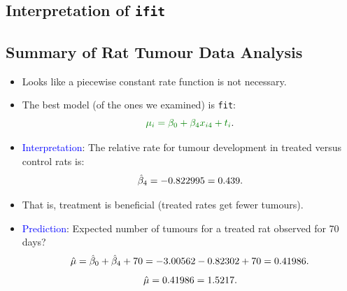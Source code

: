 \documentclass{article}\usepackage[]{graphicx}\usepackage[svgnames]{xcolor}
\makeatletter
\newcommand{\hlnum}[1]{\textcolor[rgb]{0.686,0.059,0.569}{#1}}%
\newcommand{\hlopt}[1]{\textcolor[rgb]{0,0,0}{#1}}%
\newcommand{\hlstd}[1]{\textcolor[rgb]{0.345,0.345,0.345}{#1}}%
\newcommand{\hlkwd}[1]{\textcolor[rgb]{0.737,0.353,0.396}{\textbf{#1}}}%
\newenvironment{kframe}{%
 \def\at@end@of@kframe{}%
 \ifinner\ifhmode%
  \def\at@end@of@kframe{\end{minipage}}%
  \begin{minipage}{\columnwidth}%
 \fi\fi%
 \def\FrameCommand##1{\hskip\@totalleftmargin \hskip-\fboxsep
 \colorbox{shadecolor}{##1}\hskip-\fboxsep
     \hskip-\linewidth \hskip-\@totalleftmargin \hskip\columnwidth}%
 \MakeFramed {\advance\hsize-\width
   \@totalleftmargin\z@ \linewidth\hsize
   \@setminipage}}%
 {\par\unskip\endMakeFramed%
 \at@end@of@kframe}
\newenvironment{knitrout}{}{} %
\let\exp\relax%
\let\log\relax%
\newcommand{\HN}{\textsl{H}_{\textsl{0}}}%
\makeatother
\begin{document}
\subsection*{Interpretation of \texttt{ifit}}
\subsection*{Summary of Rat Tumour Data Analysis}
\begin{itemize}
    \item Looks like a piecewise constant rate function is not necessary.
    \item The best model (of the ones we examined) is \texttt{fit}:
          \[ \textcolor{Green}{\log{\mu_i}=\beta_0+\beta_4x_{i4}+\log{t_i}}. \]
    \item \textcolor{Blue}{Interpretation}: The relative rate for tumour development in treated versus control
          rats is:
          \[ \exp{\hat{\beta}_4}=\exp{-0.822995}=0.439. \]
    \item That is, treatment is beneficial (treated rates get fewer tumours).
    \item \textcolor{Blue}{Prediction}: Expected number of tumours for a treated rat observed for 70 days?
          \[ \log{\hat{\mu}}=\hat{\beta}_0+\hat{\beta}_4+\log{70}=-3.00562-0.82302+\log{70}=0.41986. \]
          \[ \hat{\mu}=\exp{0.41986}=1.5217. \]
\end{itemize}
\end{document}
